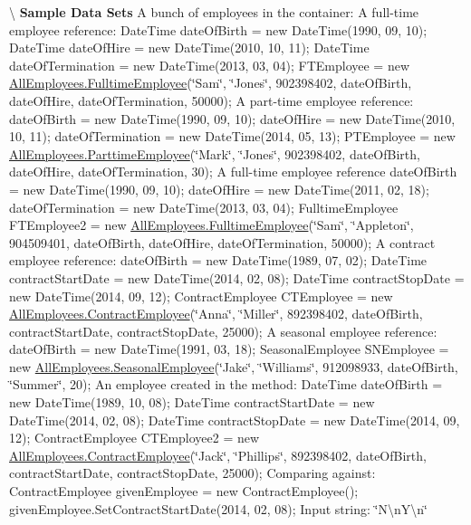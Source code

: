 \textbackslash{} {\bfseries  Sample Data Sets} A bunch of employees in the container\+: A full-\/time employee reference\+: Date\+Time date\+Of\+Birth = new Date\+Time(1990, 09, 10); Date\+Time date\+Of\+Hire = new Date\+Time(2010, 10, 11); Date\+Time date\+Of\+Termination = new Date\+Time(2013, 03, 04); F\+T\+Employee = new \hyperlink{class_all_employees_1_1_fulltime_employee}{All\+Employees.\+Fulltime\+Employee}(\char`\"{}\+Sam\char`\"{}, \char`\"{}\+Jones\char`\"{}, 902398402, date\+Of\+Birth, date\+Of\+Hire, date\+Of\+Termination, 50000); A part-\/time employee reference\+: date\+Of\+Birth = new Date\+Time(1990, 09, 10); date\+Of\+Hire = new Date\+Time(2010, 10, 11); date\+Of\+Termination = new Date\+Time(2014, 05, 13); P\+T\+Employee = new \hyperlink{class_all_employees_1_1_parttime_employee}{All\+Employees.\+Parttime\+Employee}(\char`\"{}\+Mark\char`\"{}, \char`\"{}\+Jones\char`\"{}, 902398402, date\+Of\+Birth, date\+Of\+Hire, date\+Of\+Termination, 30); A full-\/time employee reference date\+Of\+Birth = new Date\+Time(1990, 09, 10); date\+Of\+Hire = new Date\+Time(2011, 02, 18); date\+Of\+Termination = new Date\+Time(2013, 03, 04); Fulltime\+Employee F\+T\+Employee2 = new \hyperlink{class_all_employees_1_1_fulltime_employee}{All\+Employees.\+Fulltime\+Employee}(\char`\"{}\+Sam\char`\"{}, \char`\"{}\+Appleton\char`\"{}, 904509401, date\+Of\+Birth, date\+Of\+Hire, date\+Of\+Termination, 50000); A contract employee reference\+: date\+Of\+Birth = new Date\+Time(1989, 07, 02); Date\+Time contract\+Start\+Date = new Date\+Time(2014, 02, 08); Date\+Time contract\+Stop\+Date = new Date\+Time(2014, 09, 12); Contract\+Employee C\+T\+Employee = new \hyperlink{class_all_employees_1_1_contract_employee}{All\+Employees.\+Contract\+Employee}(\char`\"{}\+Anna\char`\"{}, \char`\"{}\+Miller\char`\"{}, 892398402, date\+Of\+Birth, contract\+Start\+Date, contract\+Stop\+Date, 25000); A seasonal employee reference\+: date\+Of\+Birth = new Date\+Time(1991, 03, 18); Seasonal\+Employee S\+N\+Employee = new \hyperlink{class_all_employees_1_1_seasonal_employee}{All\+Employees.\+Seasonal\+Employee}(\char`\"{}\+Jake\char`\"{}, \char`\"{}\+Williams\char`\"{}, 912098933, date\+Of\+Birth, \char`\"{}\+Summer\char`\"{}, 20); An employee created in the method\+: Date\+Time date\+Of\+Birth = new Date\+Time(1989, 10, 08); Date\+Time contract\+Start\+Date = new Date\+Time(2014, 02, 08); Date\+Time contract\+Stop\+Date = new Date\+Time(2014, 09, 12); Contract\+Employee C\+T\+Employee2 = new \hyperlink{class_all_employees_1_1_contract_employee}{All\+Employees.\+Contract\+Employee}(\char`\"{}\+Jack\char`\"{}, \char`\"{}\+Phillips\char`\"{}, 892398402, date\+Of\+Birth, contract\+Start\+Date, contract\+Stop\+Date, 25000); Comparing against\+: Contract\+Employee given\+Employee = new Contract\+Employee(); given\+Employee.\+Set\+Contract\+Start\+Date(2014, 02, 08); Input string\+: \char`\"{}\+N\textbackslash{}n\+Y\textbackslash{}n\char`\"{}

